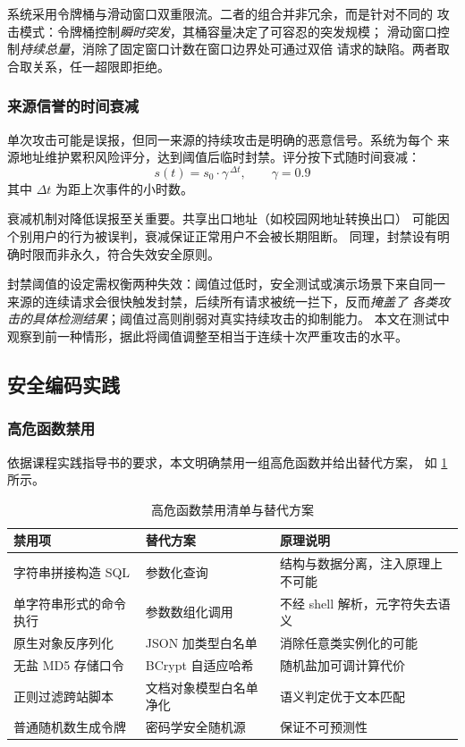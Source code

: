 系统采用令牌桶与滑动窗口双重限流。二者的组合并非冗余，而是针对不同的
攻击模式：令牌桶控制\emph{瞬时突发}，其桶容量决定了可容忍的突发规模；
滑动窗口控制\emph{持续总量}，消除了固定窗口计数在窗口边界处可通过双倍
请求的缺陷。两者取合取关系，任一超限即拒绝。

\subsubsection{来源信誉的时间衰减}

单次攻击可能是误报，但同一来源的持续攻击是明确的恶意信号。系统为每个
来源地址维护累积风险评分，达到阈值后临时封禁。评分按下式随时间衰减：
\begin{equation}
s(t) = s_0 \cdot \gamma^{\,\Delta t}, \qquad \gamma = 0.9
\end{equation}
其中 $\Delta t$ 为距上次事件的小时数。

衰减机制对降低误报至关重要。共享出口地址（如校园网地址转换出口）
可能因个别用户的行为被误判，衰减保证正常用户不会被长期阻断。
同理，封禁设有明确时限而非永久，符合失效安全原则。

\begin{remark}[阈值设定的实践考量]
封禁阈值的设定需权衡两种失效：阈值过低时，安全测试或演示场景下来自同一
来源的连续请求会很快触发封禁，后续所有请求被统一拦下，反而\emph{掩盖了
各类攻击的具体检测结果}；阈值过高则削弱对真实持续攻击的抑制能力。
本文在测试中观察到前一种情形，据此将阈值调整至相当于连续十次严重攻击的水平。
\end{remark}

\subsection{安全编码实践}

\subsubsection{高危函数禁用}

依据课程实践指导书的要求，本文明确禁用一组高危函数并给出替代方案，
如 \cref{tab:banned-func} 所示。

\begin{table}[htbp]
\centering
\caption{高危函数禁用清单与替代方案}
\label{tab:banned-func}
\small
\begin{tabular}{@{}l l p{4.4cm}@{}}
\toprule
\textbf{禁用项} & \textbf{替代方案} & \textbf{原理说明} \\
\midrule
字符串拼接构造 SQL & 参数化查询 & 结构与数据分离，注入原理上不可能 \\
单字符串形式的命令执行 & 参数数组化调用 & 不经 shell 解析，元字符失去语义 \\
原生对象反序列化 & JSON 加类型白名单 & 消除任意类实例化的可能 \\
无盐 MD5 存储口令 & BCrypt 自适应哈希 & 随机盐加可调计算代价 \\
正则过滤跨站脚本 & 文档对象模型白名单净化 & 语义判定优于文本匹配 \\
普通随机数生成令牌 & 密码学安全随机源 & 保证不可预测性 \\
\bottomrule
\end{tabular}
\end{table}

